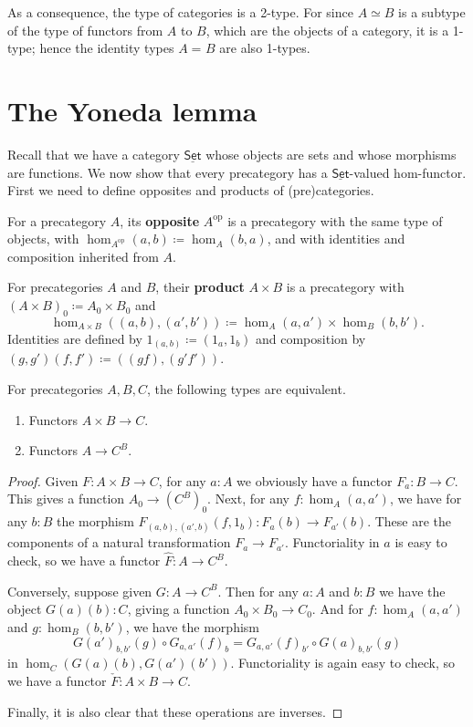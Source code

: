 \documentclass{amsart}
\newcommand{\defeq}{\coloneqq}  %
\newcommand{\id}[3][]{\ensuremath{#2 =_{#1} #3}\xspace}
\renewcommand{\set}{\ensuremath{\mathsf{Set}}\xspace}
\newcommand{\uset}{\ensuremath{\underline{\set}}\xspace}
\theoremstyle{definition}
\theoremstyle{remark}
\numberwithin{equation}{section}
\newcommand{\op}{^{\textrm{op}}}
\begin{document}
As a consequence, the type of categories is a 2-type.
For since $A\simeq B$ is a subtype of the type of functors from $A$ to $B$, which are the objects of a category, it is a 1-type; hence the identity types $\id A B$ are also 1-types.


\section{The Yoneda lemma}
\label{sec:yoneda}

Recall that we have a category \uset whose objects are sets and whose morphisms are functions.
We now show that every precategory has a \uset-valued hom-functor.
First we need to define opposites and products of (pre)categories.

\begin{defn}
  For a precategory $A$, its \textbf{opposite} $A\op$ is a precategory with the same type of objects, with $\hom_{A\op}(a,b) \defeq \hom_A(b,a)$, and with identities and composition inherited from $A$.
\end{defn}

\begin{defn}
  For precategories $A$ and $B$, their \textbf{product} $A\times B$ is a precategory with $(A\times B)_0 \defeq A_0 \times B_0$ and
  \[\hom_{A\times B}((a,b),(a',b')) \defeq \hom_A(a,a') \times \hom_B(b,b').\]
  Identities are defined by $1_{(a,b)}\defeq (1_a,1_b)$ and composition by $(g,g')(f,f') \defeq ((gf),(g'f'))$.
\end{defn}

\begin{lem}\label{ct:functorexpadj}
  For precategories $A,B,C$, the following types are equivalent.
  \begin{enumerate}
  \item Functors $A\times B\to C$.
  \item Functors $A\to C^B$.
  \end{enumerate}
\end{lem}
\begin{proof}
  Given $F:A\times B\to C$, for any $a:A$ we obviously have a functor $F_a : B\to C$.
  This gives a function $A_0 \to (C^B)_0$.
  Next, for any $f:\hom_A(a,a')$, we have for any $b:B$ the morphism $F_{(a,b),(a',b)}(f,1_b):F_a(b) \to F_{a'}(b)$.
  These are the components of a natural transformation $F_a \to F_{a'}$.
  Functoriality in $a$ is easy to check, so we have a functor $\hat{F}:A\to C^B$.

  Conversely, suppose given $G:A\to C^B$.
  Then for any $a:A$ and $b:B$ we have the object $G(a)(b):C$, giving a function $A_0 \times B_0 \to C_0$.
  And for $f:\hom_A(a,a')$ and $g:\hom_B(b,b')$, we have the morphism
  \begin{equation*}
     G(a')_{b,b'}(g)\circ G_{a,a'}(f)_b = G_{a,a'}(f)_{b'} \circ  G(a)_{b,b'}(g)
  \end{equation*}
  in $\hom_C(G(a)(b), G(a')(b'))$.
  Functoriality is again easy to check, so we have a functor $\check{F}:A\times B \to C$.

  Finally, it is also clear that these operations are inverses.
\end{proof}
\end{document}
